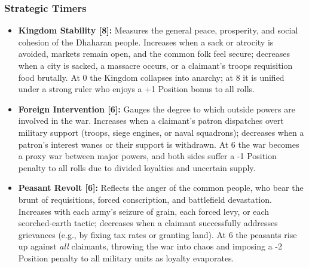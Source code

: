 \documentclass[11pt]{article}
\begin{document}
\subsubsection{Strategic Timers}
\begin{itemize}
    \item \textbf{Kingdom Stability [8]:} Measures the general peace, prosperity, and social cohesion of the Dhaharan people. Increases when a sack or atrocity is avoided, markets remain open, and the common folk feel secure; decreases when a city is sacked, a massacre occurs, or a claimant's troops requisition food brutally. At 0 the Kingdom collapses into anarchy; at 8 it is unified under a strong ruler who enjoys a +1 Position bonus to all rolls.
    \item \textbf{Foreign Intervention [6]:} Gauges the degree to which outside powers are involved in the war. Increases when a claimant's patron dispatches overt military support (troops, siege engines, or naval squadrons); decreases when a patron's interest wanes or their support is withdrawn. At 6 the war becomes a proxy war between major powers, and both sides suffer a -1 Position penalty to all rolls due to divided loyalties and uncertain supply.
    \item \textbf{Peasant Revolt [6]:} Reflects the anger of the common people, who bear the brunt of requisitions, forced conscription, and battlefield devastation. Increases with each army's seizure of grain, each forced levy, or each scorched-earth tactic; decreases when a claimant successfully addresses grievances (e.g., by fixing tax rates or granting land). At 6 the peasants rise up against \textit{all} claimants, throwing the war into chaos and imposing a -2 Position penalty to all military units as loyalty evaporates.
\end{itemize}
\end{document}
